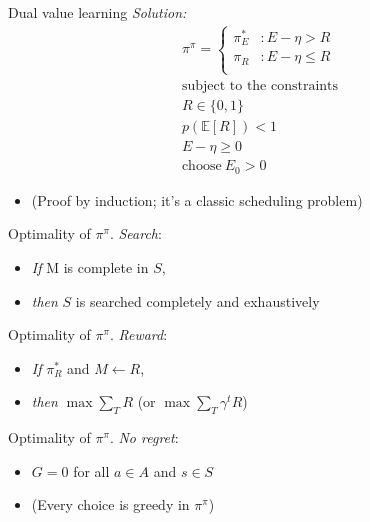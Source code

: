\documentclass[10pt]{beamer}
\begin{document}
\begin{frame}[fragile]{Dual value learning}
\textit{Solution:}
\begin{equation*}
    \label{eq:pipi} 
	\begin{split}
		\pi^{\pi} = 
		\begin{cases}
			\pi^*_E & : E - \eta > R \\
			\pi_R & : E - \eta \le R \\
		\end{cases}
		\\
		\text{subject to the constraints}\\
		R \in \{0, 1\} \\
		p(\mathbb E[R]) < 1 \\
		E - \eta \geq 0 \\
		\text{choose}\ E_0 > 0
	\end{split}
\end{equation*}
\begin{itemize}
\item (Proof by induction; it's a classic scheduling problem)
\end{itemize}
\end{frame}

\begin{frame}[fragile]{Optimality of $\pi^\pi$.}
\textit{Search}:
\begin{itemize}
\item \textit{If} M is complete in $S$, 
\item \textit{then} $S$ is searched completely and exhaustively
\end{itemize}
\end{frame}

\begin{frame}[fragile]{Optimality of $\pi^\pi$.}
\textit{Reward}:
\begin{itemize}
    \item \textit{If} $\pi^*_R$ and $M \leftarrow R$,
    \item \textit{then} $\max \sum_T R$ (or $\max \sum_T \gamma^t R$)
\end{itemize}
\end{frame}

\begin{frame}[fragile]{Optimality of $\pi^\pi$.}
\textit{No regret}:
\begin{itemize}
\item $G = 0$ for all $a \in A$ and $s \in S$
\item (Every choice is greedy in $\pi^{\pi}$)
\end{itemize}
\end{frame}
\end{document}
